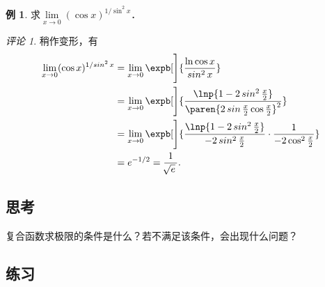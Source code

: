 \documentclass[a4paper,punct=CCT]{ctexbook}
\theoremstyle{definition}
\newtheorem*{example*}{例}
\theoremstyle{remark}
\newtheorem*{remark}{评论}
\newif\ifshowex
\newif\ifshowsolp
\begin{document}
\begin{example*}
  求\(\lim\limits_{x\to0} (\cos x)^{1/\!\sin^2 x}\)．

  \begin{remark}
    稍作变形，有
    \begin{align*}
      \lim_{x\to0} (\cos x)^{1/\!\sin^2 x}
      &= \lim_{x\to0} \expb[\Bigg]{\frac{\ln \cos x}{\sin^2 x}} \\
      &= \lim_{x\to0} \expb[\Bigg]{
        \frac{\lnp{1 - 2 \sin^2 \frac x2}}{
        \paren{2 \sin\frac x2 \cos\frac x2}^2}} \\
      &= \lim_{x\to0} \expb[\Bigg]{
        \frac{\lnp{1 - 2 \sin^2 \frac x2}}{-2 \sin^2 \frac x2}
        \cdot \frac{1}{-2 \cos^2 \frac x2}} \\
      &= e^{-1/2} = \frac1{\!\sqrt e\,}.
    \end{align*}
  \end{remark}
\end{example*}

\subsection*{思考}

复合函数求极限的条件是什么？若不满足该条件，会出现什么问题？

\ifshowsolp
\pskip
要在自变量趋向的点附近存在一个去心邻域，使得内部函数在此邻域上不等于所趋向的极限值．若不满足，则可能所求的极限不存在，或者等于其他值．
\fi

\ifshowex
{}
\subsection*{练习}
\end{document}
